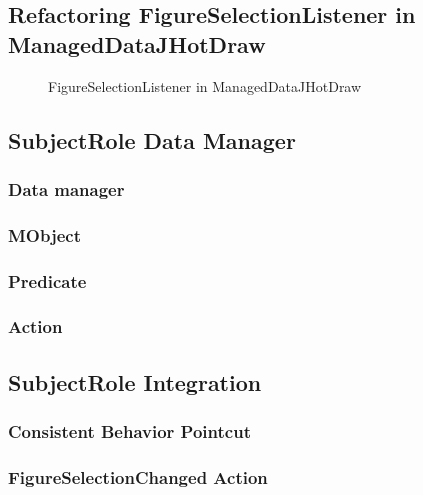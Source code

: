 \subsection{Refactoring FigureSelectionListener in ManagedDataJHotDraw}

\begin{figure}[H]
	\centering
  	\caption{FigureSelectionListener in ManagedDataJHotDraw}
  	\label{fig:JHotDraw_FigureSelectionListener_MD}
\end{figure}

\subsection{SubjectRole Data Manager}
\subsubsection{Data manager}
\subsubsection{MObject}
\subsubsection{Predicate}
\subsubsection{Action}

\subsection{SubjectRole Integration}
\subsubsection{Consistent Behavior Pointcut}


\subsubsection{FigureSelectionChanged Action}



